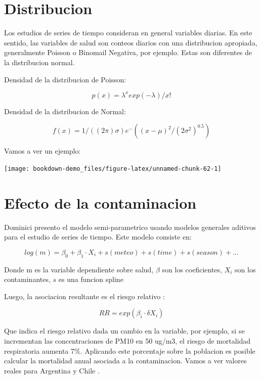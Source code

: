 \documentclass[]{book}
\begin{document}
\hypertarget{distribucion}{%
\section{Distribucion}\label{distribucion}}

Los estudios de series de tiempo consideran en general variables diarias. En este sentido, las variables de salud son conteos diarios con una distribucion apropiada, generalmente Poisson o Binomail Negativa, por ejemplo. Estas son diferentes de la distribucion normal.

Densidad de la distribucion de Poisson:

\begin{equation}
p(x) = \lambda^x exp(-\lambda)/x!
\label{eq:12}
\end{equation}

Densidad de la distribucion de Normal:

\begin{equation}
f(x) = 1/( (2 \pi) \sigma) e^-((x - \mu)^2/(2 \sigma^2)^0.5 )
\label{eq:13}
\end{equation}

Vamos a ver un ejemplo:

\texttt{[image: bookdown-demo\_files/figure-latex/unnamed-chunk-62-1]}

\hypertarget{efecto-de-la-contaminacion}{%
\section{Efecto de la contaminacion}\label{efecto-de-la-contaminacion}}

Dominici presento el modelo semi-parametrico usando modelos generales aditivos \citep{gam} para el estudio de series de tiempo. Este modelo consiste en:

\begin{equation}
log(m) = \beta_0 + \beta_1 \cdot X_i + s(meteo) + s(time) + s(season) + ...
\label{eq:13}
\end{equation}

Donde m es la variable dependiente sobre salud, \(\beta\) son los coeficientes, \(X_i\) son los contaminantes, \(s\) es una funcion spline

Luego, la asociacion resultante es el riesgo relativo \citep{rosana}:

\begin{equation}
RR = exp(\beta_i \cdot \delta X_i)
\label{eq:13}
\end{equation}

Que indica el riesgo relativo dada un cambio en la variable, por ejemplo, si se incrementan las concentraciones de PM10 en 50 ug/m3, el riesgo de mortalidad respiratoria aumenta 7\%. Aplicando este porcentaje sobre la poblacion es posible calcular la mortalidad anual asociada a la contaminacion. Vamos a ver valores reales para Argentina y Chile \citep{rosana}.
\end{document}
